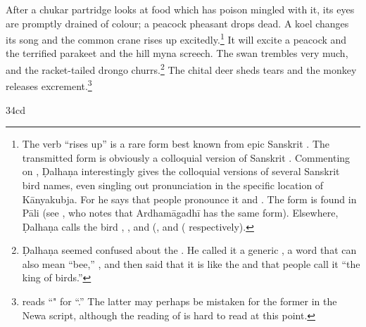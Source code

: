 \begin{translation}
After a chukar partridge %
looks at food which has poison mingled with it, its eyes are promptly drained of
colour; a peacock pheasant %
drops dead.  A koel %
changes its song and the common crane %
rises up excitedly.\footnote{The verb  “rises up” is a rare form
best known from epic Sanskrit \citep[see][212, \S 7.6.1]{ober-2003}.   The
transmitted form  is obviously a colloquial version of Sanskrit
.  Commenting on , Ḍalhaṇa interestingly gives the
colloquial versions of several Sanskrit bird names, even singling out
pronunciation in the specific location of Kānyakubja.  For  he says
that people pronounce it  and .  The form 
is found in Pāli (see \cite[731]{cone-dict}, who notes that Ardhamāgadhī has the
same form). Elsewhere, Ḍalhaṇa calls the bird ,  , and 
(,  and
( respectively).}  It will excite a peacock 
and the terrified parakeet %
and the hill myna %
screech. The swan %
trembles very much, and the racket-tailed drongo %
churrs.\footnote{Ḍalhaṇa seemed confused about the .  He called it a generic , a word that can also mean 
“bee,” \citep[62]{dave}, and then said that it is like the
 \citep[for a nice explanation of this name,
see][62--63]{dave} and that people call it “the king of birds.”} The chital deer
sheds tears and the
monkey releases excrement.\footnote{ reads 
“" for
“.”  The latter may perhaps be mistaken for the former in
the Newa script, although the reading of  is hard to 
read at this point.}

\item[34cd]


\end{translation}
